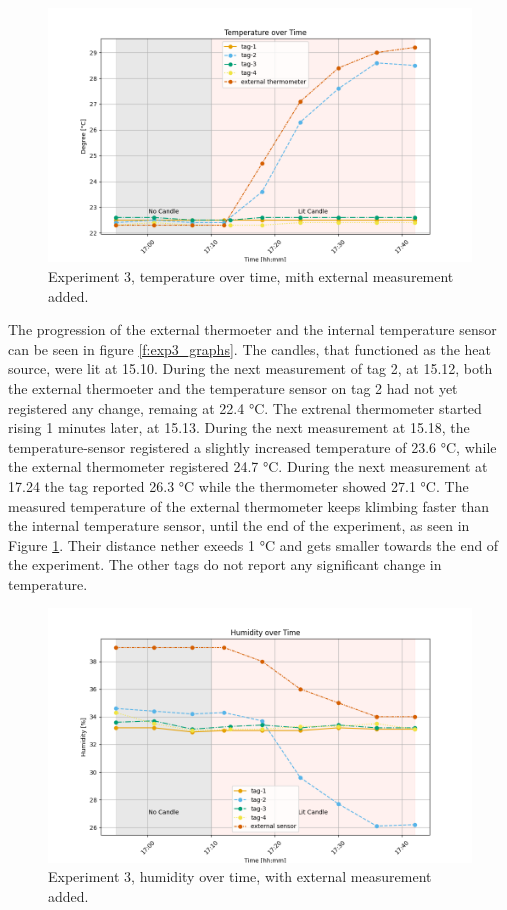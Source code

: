 \begin{figure}[ht!]
\includegraphics[width=\linewidth]{graphics/exp/exp3_temp_plot_1.png}
 \caption{Experiment 3, temperature over time, mith external measurement added.}
\label{f:exp3_graphs_temp}
\end{figure}

The progression of the external thermoeter and the internal temperature sensor can be seen in figure \ref{f:exp3_graphs}.
The candles, that functioned as the heat source, were lit at 15.10.
During the next measurement of tag 2, at 15.12, both the external thermoeter and the temperature sensor on tag 2 had not yet registered any change, remaing at 22.4 °C.
The extrenal thermometer started rising 1 minutes later, at 15.13.
During the next measurement at 15.18, the temperature-sensor registered a slightly increased temperature of 23.6 °C, while the external thermometer registered 24.7 °C.
During the next measurement at 17.24 the tag reported 26.3 °C while the thermometer showed 27.1 °C. 
The measured temperature of the external thermometer keeps klimbing faster than the internal temperature sensor, until the end of the experiment, as seen in Figure \ref{f:exp3_graphs_temp}.
Their distance nether exeeds 1 °C and gets smaller towards the end of the experiment.
The other tags do not report any significant change in temperature.

\begin{figure}[ht!]
\includegraphics[width=\linewidth]{graphics/exp/exp3_hum_plot_1.png}
 \caption{Experiment 3, humidity over time, with external measurement added.}
\label{f:exp3_graphs_hum}
\end{figure}


